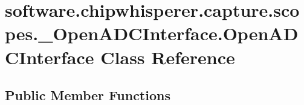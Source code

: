 \hypertarget{classsoftware_1_1chipwhisperer_1_1capture_1_1scopes_1_1__OpenADCInterface_1_1OpenADCInterface}{}\section{software.\+chipwhisperer.\+capture.\+scopes.\+\_\+\+Open\+A\+D\+C\+Interface.\+Open\+A\+D\+C\+Interface Class Reference}
\label{classsoftware_1_1chipwhisperer_1_1capture_1_1scopes_1_1__OpenADCInterface_1_1OpenADCInterface}
\subsection*{Public Member Functions}
